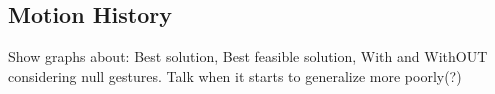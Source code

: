 \subsection{Motion History}
Show graphs about:
Best solution,
Best feasible solution,
With and WithOUT considering null gestures.
Talk when it starts to generalize more poorly(?)
